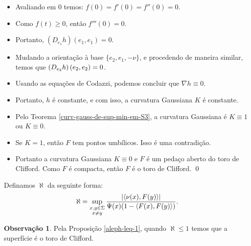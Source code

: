 \documentclass[12pt,a4paper]{beamer}
\theoremstyle{definition}
\newtheorem{observacao}{Observação}
\begin{document}
\begin{frame}
	\begin{itemize}
		\item Avaliando em $0$ temos: $f(0)=f'(0)=f''(0)=0$.
		
		\item Como $f(t) \geq 0$, então $f'''(0)=0$.
		
		\item Portanto, $(D_{e_1}h)(e_1,e_1)=0$.
		
		\item Mudando a orientação à base $\{ e_2, e_1, -\nu \}$, e procedendo de maneira similar, temos que $\left( D_{e_2}h \right) \left( e_2,e_2 \right)=0$.
		
		\item Usando as equações de Codazzi, podemos concluir que $\nabla h \equiv 0$.
		
		\item Portanto, $h$ é constante, e com isso, a curvatura Gaussiana $K$ é constante.
	\end{itemize}
\end{frame}





\begin{frame}
	\begin{itemize}
		
		\item Pelo Teorema \ref{curv-gauss-de-sup-min-em-S3}, a curvatura Gaussiana é $K \equiv 1$ ou $K \equiv 0$.
		
		\item Se $K=1$, então $F$ tem pontos umbílicos. 
		Isso é uma contradição.
		
		\item Portanto a curvatura Gaussiana $K \equiv 0$ e $F$ é um pedaço aberto do toro de Clifford.
		Como $F$ é compacta, então $F$ é o toro de Clifford.
		\qed
	\end{itemize}
\end{frame}

\begin{frame}
	Definamos $\aleph$ da seguinte forma:
		\begin{equation*}
			\aleph = \sup_{\substack{x,y \in \Sigma \\ x \neq y}} \frac{\left| \left\langle \nu(x),F(y) \right\rangle \right|}{\Psi(x) (1-\left\langle F(x),F(y) \right\rangle)}.
		\end{equation*}


	\begin{observacao}
		Pela Proposição \ref{aleph-leq-1}, quando $\aleph \leq 1$ temos que a superfície é o toro de Clifford. 
	\end{observacao}
\end{frame}
\end{document}

